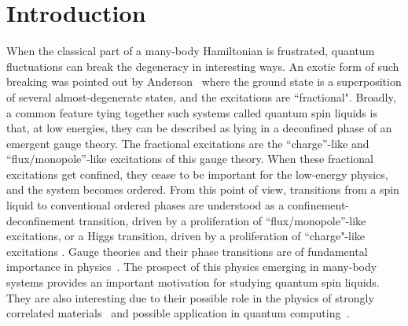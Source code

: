 \documentclass[twocolumn,superscriptaddress,amsmath,amssymb,aps,prx,nofootinbib]{revtex4-2}
\begin{document}
\section{Introduction}
When the classical part of a many-body Hamiltonian is frustrated, quantum fluctuations can break the degeneracy in interesting ways. An exotic form of such breaking was pointed out by Anderson~\cite{anderson1973resonating} where the ground state is a  superposition of several almost-degenerate states, and the excitations are ``fractional"\cite{savary2017}. Broadly, a common feature tying together such systems called quantum spin liquids is that, at low energies, they can be described as lying in a deconfined phase of an emergent gauge theory. The fractional excitations are the ``charge''-like and ``flux/monopole''-like excitations of this gauge theory. When these fractional excitations get confined, they cease to be important for the low-energy physics, and the system becomes ordered.  From this point of view, transitions from a spin liquid to conventional ordered phases are understood as a confinement-deconfinement transition, driven by a proliferation of ``flux/monopole''-like excitations, or a Higgs transition, driven by a proliferation of ``charge"-like excitations \cite{senthil2004deconfined,hermele2005algebraic,song2019unifying,nambiar2022monopole, chen2017symmetry, nussinov2007high}. Gauge theories and their phase transitions are of fundamental importance in physics~\cite{marciano1978quantum,meyer1996phase,kogut1983lattice,o2000gauge}. The prospect of this physics emerging in many-body systems provides an important motivation for studying quantum spin liquids. They are also interesting due to their possible role in the physics of strongly correlated materials~\cite{lee2006doping} and possible application in quantum computing~\cite{kitaev2003fault,nayak2008non}. 
\end{document}
